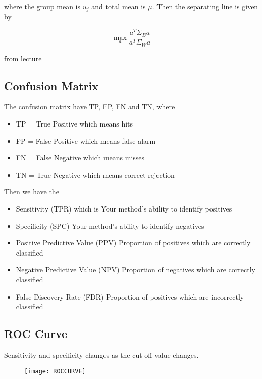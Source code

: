 where the group mean is $u_j$ and total mean is $\mu$. Then the separating line is given by

\[
    \max\limits_a \frac{a^T \Sigma_B a}{a^T \Sigma_W a}
\]

from lecture \cite[p.~59]{lecture1}

\cite[p.~106-]{friedman2016elements}

\subsection{Confusion Matrix}

The confusion matrix have TP, FP, FN and TN, where

\begin{itemize}
  \item TP = True Positive which means hits
  \item FP = False Positive which means false alarm
  \item FN = False Negative which means misses
  \item TN = True Negative which means correct rejection
\end{itemize}

Then we have the

\begin{itemize}
  \item Sensitivity (TPR) which is Your method’s ability to identify positives
  \item Specificity (SPC) Your method’s ability to identify negatives
  \item Positive Predictive Value (PPV) Proportion of positives which are correctly classified
  \item Negative Predictive Value (NPV) Proportion of negatives which are correctly classified
  \item False Discovery Rate (FDR) Proportion of positives which are incorrectly classified
\end{itemize}

\subsection{ROC Curve}

Sensitivity and specificity changes as the cut-off value changes.

\begin{figure}[H]
  \centering
  \texttt{[image: ROCCURVE]}
\end{figure}

